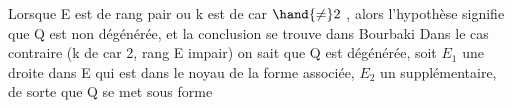 Lorsque E est de rang pair ou k est de car $\hand{\neq} 2$ , alors l'hypothèse
signifie que Q est non dégénérée, et la conclusion se trouve dans Bourbaki
Dans le cas contraire (k de car 2,  rang E impair)  on sait que Q est
dégénérée,  soit $E_1$ une droite dans E qui est dans le noyau de la
forme associée, $E_2$ un supplémentaire, de sorte que Q se met sous forme

